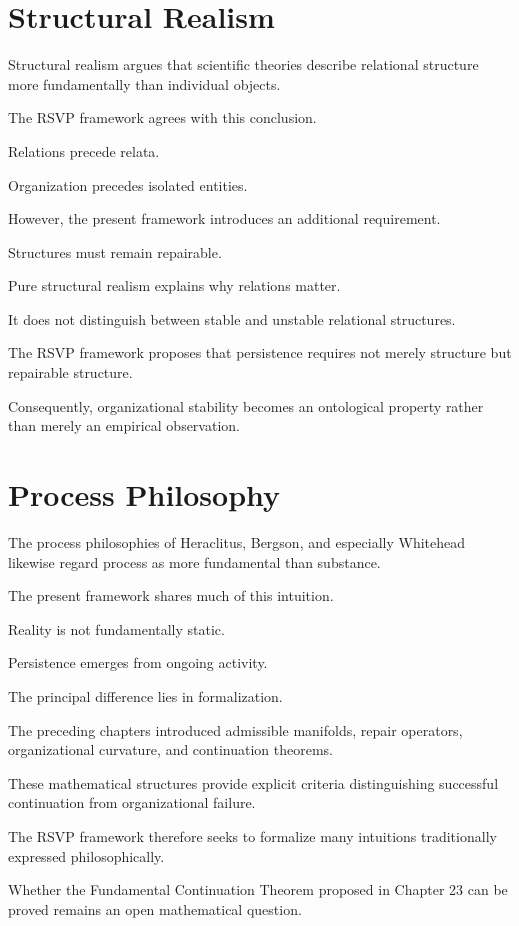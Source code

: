 \documentclass[11pt,oneside]{book}
\numberwithin{equation}{chapter}
\theoremstyle{definition}
\theoremstyle{plain}
\begin{document}
\section{Structural Realism}

Structural realism argues that scientific theories describe relational
structure more fundamentally than individual objects.

The RSVP framework agrees with this conclusion.

Relations precede relata.

Organization precedes isolated entities.

However, the present framework introduces an additional requirement.

Structures must remain repairable.

Pure structural realism explains why relations matter.

It does not distinguish between stable and unstable relational structures.

The RSVP framework proposes that persistence requires not merely structure
but repairable structure.

Consequently, organizational stability becomes an ontological property
rather than merely an empirical observation.

\section{Process Philosophy}

The process philosophies of Heraclitus, Bergson, and especially Whitehead
likewise regard process as more fundamental than substance.

The present framework shares much of this intuition.

Reality is not fundamentally static.

Persistence emerges from ongoing activity.

The principal difference lies in formalization.

The preceding chapters introduced admissible manifolds, repair operators,
organizational curvature, and continuation theorems.

These mathematical structures provide explicit criteria distinguishing
successful continuation from organizational failure.

The RSVP framework therefore seeks to formalize many intuitions
traditionally expressed philosophically.

Whether the Fundamental Continuation Theorem proposed in Chapter 23 can be
proved remains an open mathematical question.
\end{document}
